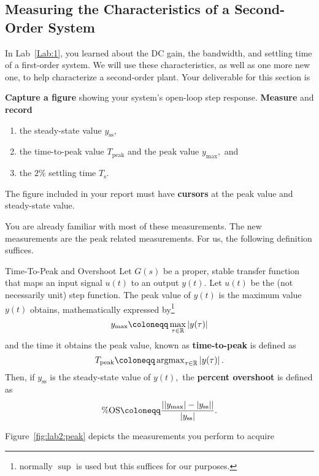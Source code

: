 \subsection{Measuring the Characteristics of a Second-Order System}
In Lab~\ref{Lab:1}, you learned about the DC gain, the bandwidth, and
settling time of a first-order system.
We will use these characteristics, as well as one more new one, to help
characterize a second-order plant.
%
Your deliverable for this section is
%
\begin{deliverable}[label={lab2:d1}]
  \textbf{Capture a figure} showing your system's open-loop step response.
  \textbf{Measure} and \textbf{record}
  \begin{enumerate}[label=(\arabic*)]
    \item{the steady-state value \(y_{\mathrm{ss}},\)}
    \item{
      the time-to-peak value \(T_{\mathrm{peak}}\) and
      the peak value \(y_{\mathrm{max}},\) and
    }
    \item{
      the \(2\%\) settling time \(T_{\mathrm{s}}.\)
    }
  \end{enumerate}
  The figure included in your report must have \textbf{cursors} at the peak
  value and steady-state value.
\end{deliverable}
%
You are already familiar with most of these measurements. The new measurements
are the peak related measurements. For us, the following definition suffices.
%
\begin{definition}[]{Time-To-Peak and Overshoot}
  Let \(G(s)\) be a proper, stable transfer function
  that maps an input signal \(u(t)\) to an output \(y(t).\)
%
  Let \(u(t)\) be the (not necessarily unit) step function. The peak value
  of \(y(t)\) is the maximum value \(y(t)\) obtains, mathematically expressed
  by\footnote{normally \(\sup\) is used but this suffices for our purposes.}
  \[
    y_\mathrm{max} \defineas \max_{\tau \in \Real} \left| y(\tau) \right|
  \]
  and the time it obtains the peak value, known as \textbf{time-to-peak}
  is defined as
  \[
    T_\mathrm{peak} \defineas \argmax_{\tau \in \Real} \left| y(\tau) \right|.
  \]
  Then, if \(y_\mathrm{ss}\) is the steady-state value of \(y(t),\) the
  \textbf{percent overshoot} is defined as
  \[
    \%\mathrm{OS}
      \defineas
        \frac{%
          \left|
            \left|y_\mathrm{max}\right| - \left|y_\mathrm{ss}\right|
          \right|%
        }{%
          \left| y_\mathrm{ss}\right|%
        }.
  \]
\end{definition}
%
Figure~\ref{fig:lab2:peak} depicts the measurements you perform to acquire
